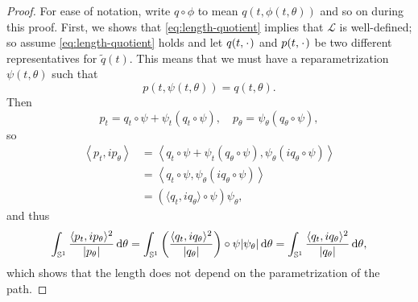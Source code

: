 \begin{proof}
  For ease of notation, write $q \circ \phi$ to mean $q(t, \phi(t,\theta))$ and so on during this proof.
  First, we shows that \eqref{eq:length-quotient} implies that $\mathcal{L}$ is well-defined; so assume \eqref{eq:length-quotient} holds and let $q(t,\blank)$ and $p(t, \blank)$ be two different representatives for $\tilde{q}(t)$. This means that we must have a reparametrization $\psi(t,\theta)$ such that
  \begin{equation*}
    p(t, \psi(t,\theta)) = q(t, \theta).
  \end{equation*}
  Then
  \begin{equation*}
    p_t = q_t\circ \psi + \psi_t (q_t \circ \psi), \quad
    p_{\theta} = \psi_{\theta}(q_{\theta} \circ \psi),
  \end{equation*}
  so
  \begin{equation*}
    \begin{aligned}
      \left\langle
        p_t, i p_{\theta}
      \right\rangle
     &  =     \left\langle
        q_t \circ \psi + \psi_t (q_{\theta} \circ \psi),
        \psi_{\theta} (iq_{\theta} \circ \psi)
      \right\rangle \\
     & =     \left\langle
        q_t \circ \psi,
        \psi_{\theta} (iq_{\theta} \circ \psi)
      \right\rangle \\
      & = (\langle q_t, i q_{\theta}\rangle \circ\psi) \psi_{\theta},
    \end{aligned}
  \end{equation*}
  and thus
  \begin{equation*}
    \int_{\mathbb{S}^1} \frac{\langle p_t, i p_{\theta}\rangle^2}{|p_{\theta}|} \mathop{}\!\mathrm{d} \theta
    =
    \int_{\mathbb{S}^1}
    \left(
      \frac{\langle q_t, i q_{\theta}\rangle^2}{|q_{\theta}|}
    \right) \circ \psi |\psi_{\theta}| \mathop{}\!\mathrm{d} \theta
    =    \int_{\mathbb{S}^1}
      \frac{\langle q_t, i q_{\theta}\rangle^2}{|q_{\theta}|}  \mathop{}\!\mathrm{d} \theta,
    \end{equation*}
    which shows that the length does not depend on the parametrization of the path.


\end{proof}
